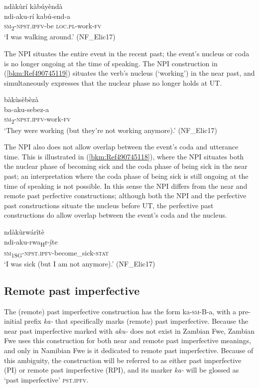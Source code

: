 \ea
\label{bkm:Ref99966261}
\glll ndàkùrí kàbúyèndà\\
ndi-aku-rí    kabú-end-a\\
\textsc{sm}\textsubscript{2}-\textsc{npst}.\textsc{ipfv}-be  \textsc{loc}.\textsc{pl}-work-\textsc{fv}\\
\glt ‘I was walking around.’ (NF\_Elic17)
\z

The NPI situates the entire event in the recent past; the event’s nucleus or coda is no longer ongoing at the time of speaking. The NPI construction in (\ref{bkm:Ref490745119}) situates the verb’s nucleus (‘working’) in the near past, and simultaneously expresses that the nuclear phase no longer holds at UT.

\ea
\label{bkm:Ref490745119}
\glll bàkùsèbèzà\\
ba-aku-sebez-a\\
\textsc{sm}\textsubscript{2}-\textsc{npst}.\textsc{ipfv}-work-\textsc{fv}\\
\glt ‘They were working (but they’re not working anymore).’ (NF\_Elic17)
\z

The NPI also does not allow overlap between the event’s coda and utterance time. This is illustrated in (\ref{bkm:Ref490745118}), where the NPI situates both the nuclear phase of becoming sick and the coda phase of being sick in the near past; an interpretation where the coda phase of being sick is still ongoing at the time of speaking is not possible. In this sense the NPI differs from the near and remote past perfective constructions; although both the NPI and the perfective past constructions situate the nucleus before UT, the perfective past constructions do allow overlap between the event’s coda and the nucleus.

\ea
\label{bkm:Ref490745118}
\glll ndàkùrwárîtè\\
ndi-aku-rwa\textsubscript{H}r-í̲te\\
\textsc{sm}\textsubscript{1SG}-\textsc{npst}.\textsc{ipfv}-become\_sick-\textsc{stat}\\
\glt ‘I was sick (but I am not anymore).’ (NF\_Elic17)
\z
\subsection{Remote past imperfective}
\label{bkm:Ref488767517}\hypertarget{Toc75352684}{}\label{bkm:Ref492377456}
The (remote) past imperfective construction has the form ka-\textsc{sm}-B-a, with a pre-initial prefix \textit{ka-} that specifically marks (remote) past imperfective. Because the near past imperfective marked with \textit{aku-} does not exist in Zambian Fwe, Zambian Fwe uses this construction for both near and remote past imperfective meanings, and only in Namibian Fwe is it dedicated to remote past imperfective. Because of this ambiguity, the construction will be referred to as either past imperfective (PI) or remote past imperfective (RPI), and its marker \textit{ka-} will be glossed as ‘past imperfective’ \textsc{pst}.\textsc{ipfv}.

